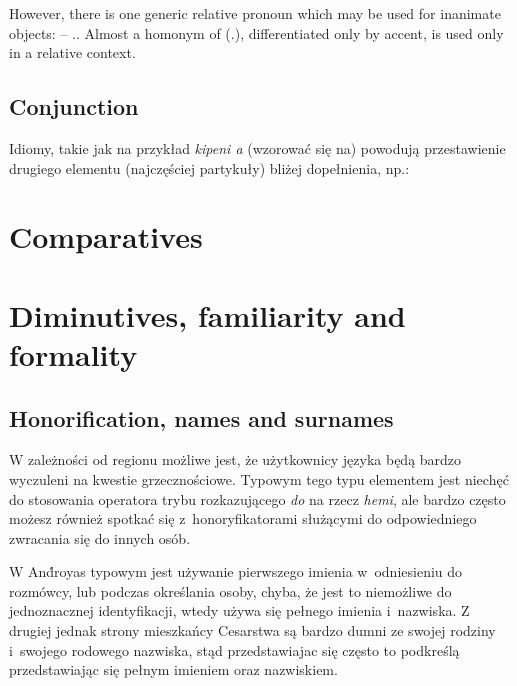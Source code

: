 However, there is one generic relative pronoun which may be used for inanimate
objects:  -- \Rel{}.\Inan{}. Almost a homonym of 
(\Tpl{}.\Inan{}), differentiated only by accent,  is used only in a
relative context.

\subsection{Conjunction }

Idiomy, takie jak na przykład \emph{kipeni a} (wzorować się na) powodują
przestawienie drugiego elementu (najczęściej partykuły) bliżej dopełnienia, np.:



\section{Comparatives}
\label{sec:comparatives}

\section{Diminutives, familiarity and formality}
\label{sec:diminutives}

\subsection{Honorification, names and surnames}

W zależności od regionu możliwe jest, że użytkownicy języka będą bardzo
wyczuleni na kwestie grzecznościowe. Typowym tego typu elementem jest niechęć do
stosowania operatora trybu rozkazującego \emph{do} na rzecz \emph{hemi}, ale
bardzo często możesz również spotkać się z~honoryfikatorami służącymi do
odpowiedniego zwracania się do innych osób.

W And́royas typowym jest używanie pierwszego imienia w~odniesieniu do rozmówcy,
lub podczas określania osoby, chyba, że jest to niemożliwe do jednoznacznej
identyfikacji, wtedy używa się pełnego imienia i~nazwiska. Z drugiej jednak
strony mieszkańcy Cesarstwa są bardzo dumni ze swojej rodziny i~swojego rodowego
nazwiska, stąd przedstawiajac się często to podkreślą przedstawiając się pełnym
imieniem oraz nazwiskiem.

